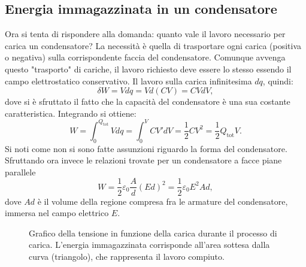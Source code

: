 \documentclass[a4paper,11pt]{report}
\begin{document}
\subsection{Energia immagazzinata in un condensatore}
Ora si tenta di rispondere alla domanda: quanto vale il lavoro necessario per carica un condensatore?
La necessità è quella di trasportare ogni carica (positiva o negativa) sulla corrispondente faccia del condensatore. Comunque avvenga questo "trasporto" di cariche, il lavoro richiesto deve essere lo stesso essendo il campo elettrostatico conservativo. Il lavoro sulla carica infinitesima $dq$, quindi:
\begin{equation}
    \delta W = Vdq = Vd(CV) = CVdV,
\end{equation}
dove si è sfruttato il fatto che la capacità del condensatore è una sua costante caratteristica. Integrando si ottiene:
\begin{equation}
    W = \int_0^{Q_\text{tot}} Vdq  = \int_0^{V} CV'dV = \frac{1}{2}CV^2 = \frac{1}{2}Q_{\text{tot}}V.
\end{equation}
Si noti come non si sono fatte assunzioni riguardo la forma del condensatore. Sfruttando ora invece le relazioni trovate per un condensatore a facce piane parallele
\begin{equation}
    W = \frac{1}{2}\varepsilon_0\frac{A}{d}(Ed)^2 = \frac{1}{2}\varepsilon_0E^2 Ad,
\end{equation}
dove $Ad$ è il volume della regione compresa fra le armature del condensatore, immersa nel campo elettrico $E$. 

\begin{figure}[htbp]
    \centering
    \caption{Grafico della tensione in funzione della carica durante il processo di carica. L'energia immagazzinata corrisponde all'area sottesa dalla curva (triangolo), che rappresenta il lavoro compiuto.}
    \label{fig:lavoro_carica}
\end{figure}
\end{document}
